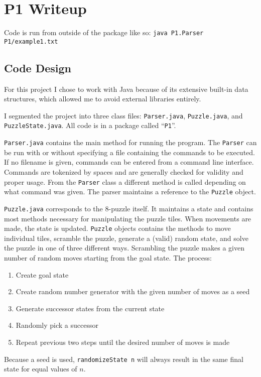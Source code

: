 \documentclass[letterpaper]{article}
\begin{document}
\section*{P1 Writeup}

Code is run from outside of the package like so: \texttt{java P1.Parser P1/example1.txt}

\subsection*{Code Design}

For this project I chose to work with Java because of its extensive built-in
data structures, which allowed me to avoid external libraries entirely.

I segmented the project into three class files: \texttt{Parser.java},
\texttt{Puzzle.java}, and \texttt{PuzzleState.java}. All code is in a package
called ``\texttt{P1}''.

\texttt{Parser.java} contains the main method for running the program. The
\texttt{Parser} can be run with or without specifying a file containing the
commands to be executed. If no filename is given, commands can be entered
from a command line interface. Commands are tokenized by spaces and are
generally checked for validity and proper usage. From the \texttt{Parser} class
a different method is called depending on what command was given. The parser
maintains a reference to the \texttt{Puzzle} object.

\texttt{Puzzle.java} corresponds to the 8-puzzle itself. It maintains a state
and contains most methods necessary for manipulating the puzzle tiles. When
movements are made, the state is updated. \texttt{Puzzle} objects contains the
methods to move individual tiles, scramble the puzzle, generate a (valid)
random state, and solve the puzzle in one of three different ways. Scrambling
the puzzle makes a given number of random moves starting from the goal state.
The process:
\begin{enumerate}
    \item Create goal state
    \item Create random number generator with the given number of moves
    as a seed
    \item Generate successor states from the current state
    \item Randomly pick a successor
    \item Repeat previous two steps until the desired number of moves is made
\end{enumerate}
Because a seed is used, \texttt{randomizeState n} will always result in the
same final state for equal values of $n$.
\end{document}
